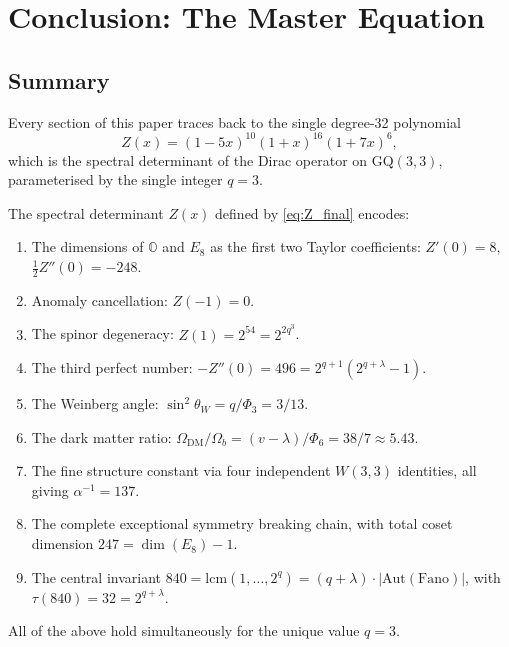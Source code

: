 \section{Conclusion: The Master Equation}
\label{sec:conclusion}

\subsection{Summary}

Every section of this paper traces back to the single degree-32
polynomial
\begin{equation}
  \label{eq:Z_final}
  \boxed{Z(x) = (1-5x)^{10}(1+x)^{16}(1+7x)^{6}},
\end{equation}
which is the spectral determinant of the Dirac operator on
$\mathrm{GQ}(3,3)$, parameterised by the single integer $q=3$.

\begin{theorem}
\label{thm:master}
The spectral determinant $Z(x)$ defined by \eqref{eq:Z_final} encodes:
\begin{enumerate}
  \item[\textup{(i)}] The dimensions of $\mathbb{O}$ and $E_8$ as the first two
    Taylor coefficients: $Z'(0)=8$, $\tfrac12 Z''(0)=-248$.
  \item[\textup{(ii)}] Anomaly cancellation: $Z(-1)=0$.
  \item[\textup{(iii)}] The spinor degeneracy: $Z(1)=2^{54}=2^{2q^3}$.
  \item[\textup{(iv)}] The third perfect number: $-Z''(0)=496=2^{q+1}(2^{q+\lambda}-1)$.
  \item[\textup{(v)}] The Weinberg angle: $\sin^2\theta_W = q/\Phi_3 = 3/13$.
  \item[\textup{(vi)}] The dark matter ratio: $\Omega_{\mathrm{DM}}/\Omega_b
    = (v-\lambda)/\Phi_6 = 38/7 \approx 5.43$.
  \item[\textup{(vii)}] The fine structure constant via four independent
    $W(3,3)$ identities, all giving $\alpha^{-1}=137$.
  \item[\textup{(viii)}] The complete exceptional symmetry breaking chain,
    with total coset dimension $247 = \dim(E_8)-1$.
  \item[\textup{(ix)}] The central invariant $840 = \mathrm{lcm}(1,\ldots,2^q)
    = (q+\lambda)\cdot|\mathrm{Aut}(\mathrm{Fano})|$, with $\tau(840)=32=2^{q+\lambda}$.
\end{enumerate}
All of the above hold simultaneously for the unique value $q=3$.
\end{theorem}

